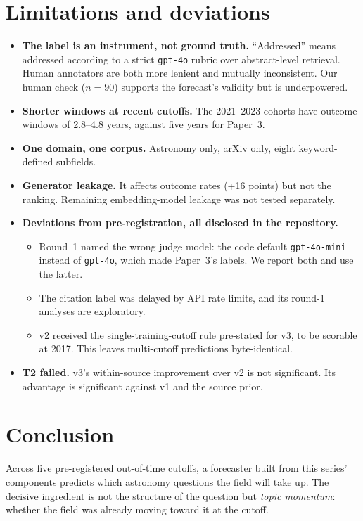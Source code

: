 \documentclass[11pt]{article}
\begin{document}
\section{Limitations and deviations}

\begin{itemize}
\item \textbf{The label is an instrument, not ground truth.} ``Addressed''
  means addressed according to a strict \texttt{gpt-4o} rubric over
  abstract-level retrieval. Human annotators are both more lenient and
  mutually inconsistent. Our human check ($n=90$) supports the forecast's
  validity but is underpowered.
\item \textbf{Shorter windows at recent cutoffs.} The 2021--2023 cohorts have
  outcome windows of 2.8--4.8 years, against five years for Paper~3.
\item \textbf{One domain, one corpus.} Astronomy only, arXiv only, eight
  keyword-defined subfields.
\item \textbf{Generator leakage.} It affects outcome rates (+16 points) but
  not the ranking. Remaining embedding-model leakage was not tested separately.
\item \textbf{Deviations from pre-registration, all disclosed in the
  repository.}
  \begin{itemize}
  \item Round~1 named the wrong judge model: the code default
    \texttt{gpt-4o-mini} instead of \texttt{gpt-4o}, which made Paper~3's
    labels. We report both and use the latter.
  \item The citation label was delayed by API rate limits, and its round-1
    analyses are exploratory.
  \item v2 received the single-training-cutoff rule pre-stated for v3, to be
    scorable at 2017. This leaves multi-cutoff predictions byte-identical.
  \end{itemize}
\item \textbf{T2 failed.} v3's within-source improvement over v2 is not
  significant. Its advantage is significant against v1 and the source prior.
\end{itemize}

\section{Conclusion}

Across five pre-registered out-of-time cutoffs, a forecaster built from this
series' components predicts which astronomy questions the field will take up.
The decisive ingredient is not the structure of the question but \emph{topic
momentum}: whether the field was already moving toward it at the cutoff.
\end{document}
